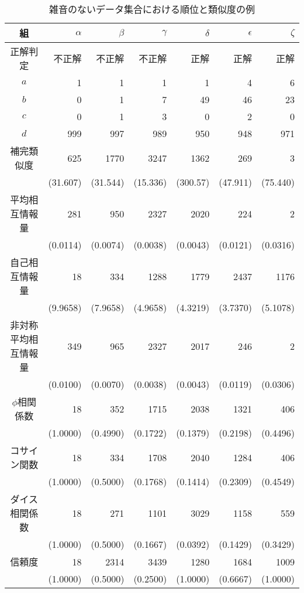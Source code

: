 \begin{table} [thbp]
\centering
\caption{雑音のないデータ集合における順位と類似度の例}\label{without-comp}
\begin{tabular}{|c||r|r|r|r|r|r|}
\hline
組 & $\alpha$ & $\beta$ & $\gamma$ & $\delta$ & $\epsilon$ & $\zeta$\\\hline\hline
正解判定 & 不正解 & 不正解 & 不正解 & 正解 & 正解 & 正解 \\\hline
$a$ & 1 & 1 & 1 & 1 & 4 & 6 \\\hline
$b$ & 0 & 1 & 7 & 49 & 46 & 23 \\\hline
$c$ & 0 & 1 & 3 & 0 & 2 & 0 \\\hline
$d$ & 999 & 997 & 989 & 950 & 948 & 971 \\\hline
{\small 補完類似度} & 625 & 1770 & 3247 & 1362 & 269 & 3 \\
{\small } & (31.607) & (31.544) & (15.336) & (300.57) & (47.911) & (75.440) \\\hline
{\small 平均相互情報量} & 281 & 950 & 2327 & 2020 & 224 & 2 \\
{\small } & (0.0114) & (0.0074) & (0.0038) & (0.0043) & (0.0121) & (0.0316) \\\hline
{\small 自己相互情報量} & 18 & 334 & 1288 & 1779 & 2437 & 1176 \\
{\small } & (9.9658) & (7.9658) & (4.9658) & (4.3219) & (3.7370) & (5.1078) \\\hline
{\small 非対称平均相互情報量} & 349 & 965 & 2327 & 2017 & 246 & 2 \\
{\small } & (0.0100) & (0.0070) & (0.0038) & (0.0043) & (0.0119) & (0.0306) \\\hline
{\small $\phi$相関係数} & 18 & 352 & 1715 & 2038 & 1321 & 406 \\
{\small } & (1.0000) & (0.4990) & (0.1722) & (0.1379) & (0.2198) & (0.4496) \\\hline
{\small コサイン関数} & 18 & 334 & 1708 & 2040 & 1284 & 406 \\
{\small } & (1.0000) & (0.5000) & (0.1768) & (0.1414) & (0.2309) & (0.4549) \\\hline
{\small ダイス相関係数} & 18 & 271 & 1101 & 3029 & 1158 & 559 \\
{\small } & (1.0000) & (0.5000) & (0.1667) & (0.0392) & (0.1429) & (0.3429) \\\hline
{\small 信頼度} & 18 & 2314 & 3439 & 1280 & 1684 & 1009 \\
{\small } & (1.0000) & (0.5000) & (0.2500) & (1.0000) & (0.6667) & (1.0000) \\\hline
\end{tabular}
\end{table}
